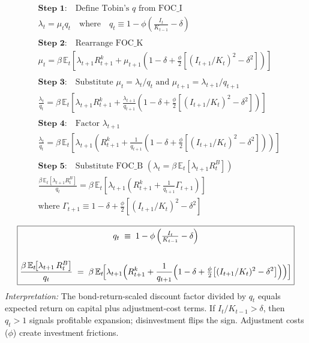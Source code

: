 \documentclass[11pt,preprint]{elsarticle}
\numberwithin{equation}{section}
\numberwithin{figure}{section}
\numberwithin{table}{section}
\begin{document}
\begin{align*}
& \textbf{Step 1:} \quad \text{Define Tobin's } q \text{ from FOC\_I} \\
& \lambda_t = \mu_t q_t \quad \text{where} \quad q_t \equiv 1 - \phi\left(\tfrac{I_t}{K_{t-1}} - \delta\right) \\
& \\
& \textbf{Step 2:} \quad \text{Rearrange FOC\_K} \\
& \mu_t = \beta\,\mathbb{E}_t\!\left[ \lambda_{t+1}R_{t+1}^k + \mu_{t+1}\!\left(1-\delta + \tfrac{\phi}{2}\left[(I_{t+1}/K_t)^2 - \delta^2\right]\right) \right] \\
& \\
& \textbf{Step 3:} \quad \text{Substitute } \mu_t = \lambda_t / q_t \text{ and } \mu_{t+1} = \lambda_{t+1} / q_{t+1} \\
& \frac{\lambda_t}{q_t} = \beta\,\mathbb{E}_t\!\left[ \lambda_{t+1}R_{t+1}^k + \frac{\lambda_{t+1}}{q_{t+1}}\left(1-\delta + \tfrac{\phi}{2}\left[(I_{t+1}/K_t)^2 - \delta^2\right]\right) \right] \\
& \\
& \textbf{Step 4:} \quad \text{Factor } \lambda_{t+1} \\
& \frac{\lambda_t}{q_t} = \beta\,\mathbb{E}_t\!\left[ \lambda_{t+1} \left( R_{t+1}^k + \frac{1}{q_{t+1}}\left(1-\delta + \tfrac{\phi}{2}\left[(I_{t+1}/K_t)^2 - \delta^2\right]\right) \right) \right] \\
& \\
& \textbf{Step 5:} \quad \text{Substitute FOC\_B } (\lambda_t = \beta\,\mathbb{E}_t[\lambda_{t+1}R_t^B]) \\
& \frac{\beta\,\mathbb{E}_t[\lambda_{t+1}R_t^B]}{q_t} = \beta\,\mathbb{E}_t\!\left[ \lambda_{t+1} \left( R_{t+1}^k + \frac{1}{q_{t+1}}\Gamma_{t+1} \right) \right] \\
& \text{where } \Gamma_{t+1} \equiv 1-\delta + \tfrac{\phi}{2}\left[(I_{t+1}/K_t)^2 - \delta^2\right]
\end{align*}

\[
\boxed{
  \begin{gathered}
  q_t \;\equiv\; 1 - \phi\,\Bigl(\tfrac{I_t}{K_{t-1}} - \delta\Bigr) \\
  \\
  \frac{\beta\,\mathbb{E}_t\!\bigl[\lambda_{t+1}\,R_t^B\bigr]}{q_t}
  \;=\;
  \beta\,\mathbb{E}_t\!\Bigl[
    \lambda_{t+1}\Bigl(
      R_{t+1}^k
      + \frac{1}{q_{t+1}}
        \Bigl(
          1 - \delta
          + \tfrac{\phi}{2}\bigl[(I_{t+1}/K_t)^2 - \delta^2\bigr]
        \Bigr)
    \Bigr)
  \Bigr]
  \end{gathered}
}
\] \textit{Interpretation:} The bond-return-scaled discount factor
divided by \(q_t\) equals expected return on capital plus
adjustment-cost terms. If \(I_t/K_{t-1}>\delta\), then \(q_t>1\) signals
profitable expansion; disinvestment flips the sign. Adjustment costs
(\(\phi\)) create investment frictions.
\end{document}
